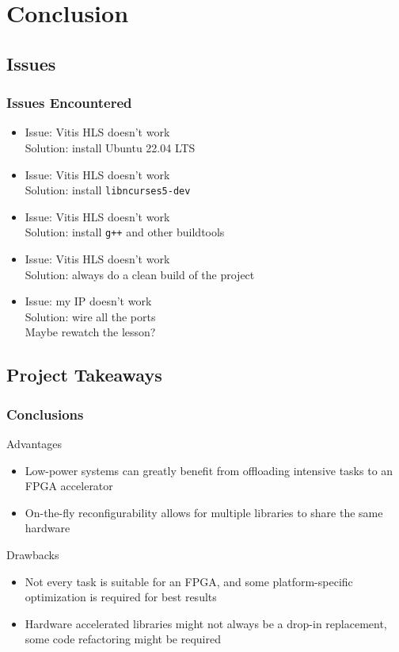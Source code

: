 \documentclass{beamer}
\begin{document}
\section{Conclusion}

\subsection{Issues}
\begin{frame}
    \frametitle{Issues Encountered}

    \begin{itemize}
         \item Issue: Vitis HLS doesn't work\\Solution: install Ubuntu 22.04 LTS
         \item Issue: Vitis HLS doesn't work\\Solution: install \texttt{libncurses5-dev}
         \item Issue: Vitis HLS doesn't work\\Solution: install \texttt{g++} and other buildtools
         \item Issue: Vitis HLS doesn't work\\Solution: always do a clean build of the project
         \item Issue: my IP doesn't work\\Solution: wire all the ports\\ Maybe rewatch the lesson? 
    \end{itemize}
\end{frame}

\subsection{Project Takeaways}
\begin{frame}
    \frametitle{Conclusions}

    \begin{block}{Advantages}
        \begin{itemize}
             \item Low-power systems can greatly benefit from offloading intensive tasks to an FPGA accelerator
             \item On-the-fly reconfigurability allows for multiple libraries to share the same hardware
        \end{itemize}
    \end{block}

   \begin{alertblock}{Drawbacks}
        \begin{itemize}
             \item Not every task is suitable for an FPGA, and some platform-specific optimization is required for best results
             \item Hardware accelerated libraries might not always be a drop-in replacement, some code refactoring might be required
        \end{itemize}
   \end{alertblock}
\end{frame}
\end{document}
